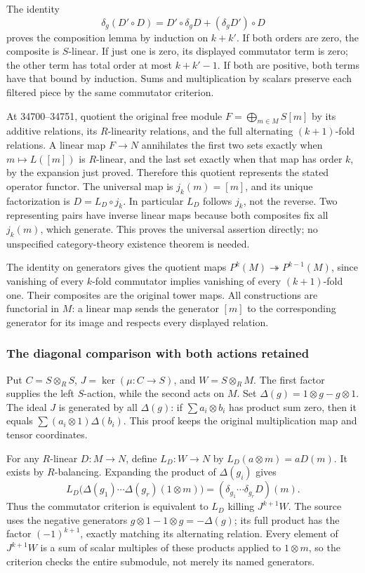 The identity \[
\delta_g(D'\circ D)=D'\circ\delta_gD+(\delta_gD')\circ D
\] proves the composition lemma by induction on \(k+k'\). If both orders are zero, the composite is \(S\)-linear. If just one is zero, its displayed commutator term is zero; the other term has total order at most \(k+k'-1\). If both are positive, both terms have that bound by induction. Sums and multiplication by scalars preserve each filtered piece by the same commutator criterion.

At 34700--34751, quotient the original free module \(F=\bigoplus_{m\in M}S[m]\) by its additive relations, its \(R\)-linearity relations, and the full alternating \((k+1)\)-fold relations. A linear map \(F\to N\) annihilates the first two sets exactly when \(m\mapsto L([m])\) is \(R\)-linear, and the last set exactly when that map has order \(k\), by the expansion just proved. Therefore this quotient represents the stated operator functor. The universal map is \(j_k(m)=[m]\), and its unique factorization is \(D=L_D\circ j_k\). In particular \(L_D\) follows \(j_k\), not the reverse. Two representing pairs have inverse linear maps because both composites fix all \(j_k(m)\), which generate. This proves the universal assertion directly; no unspecified category-theory existence theorem is needed.

The identity on generators gives the quotient maps \(P^k(M)\twoheadrightarrow P^{k-1}(M)\), since vanishing of every \(k\)-fold commutator implies vanishing of every \((k+1)\)-fold one. Their composites are the original tower maps. All constructions are functorial in \(M\): a linear map sends the generator \([m]\) to the corresponding generator for its image and respects every displayed relation.

\subsubsection{The diagonal comparison with both actions retained}\label{the-diagonal-comparison-with-both-actions-retained}

Put \(C=S\otimes_R S\), \(J=\ker(\mu:C\to S)\), and \(W=S\otimes_R M\). The first factor supplies the left \(S\)-action, while the second acts on \(M\). Set \(\Delta(g)=1\otimes g-g\otimes1\). The ideal \(J\) is generated by all \(\Delta(g)\): if \(\sum a_i\otimes b_i\) has product sum zero, then it equals \(\sum(a_i\otimes1)\Delta(b_i)\). This proof keeps the original multiplication map and tensor coordinates.

For any \(R\)-linear \(D:M\to N\), define \(L_D:W\to N\) by \(L_D(a\otimes m)=aD(m)\). It exists by \(R\)-balancing. Expanding the product of \(\Delta(g_i)\) gives \[
L_D\bigl(\Delta(g_1)\cdots\Delta(g_r)(1\otimes m)\bigr)
=(\delta_{g_1}\cdots\delta_{g_r}D)(m).
\] Thus the commutator criterion is equivalent to \(L_D\) killing \(J^{k+1}W\). The source uses the negative generators \(g\otimes1-1\otimes g=-\Delta(g)\); its full product has the factor \((-1)^{k+1}\), exactly matching its alternating relation. Every element of \(J^{k+1}W\) is a sum of scalar multiples of these products applied to \(1\otimes m\), so the criterion checks the entire submodule, not merely its named generators.

